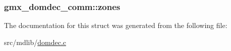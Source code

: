 \hypertarget{structgmx__domdec__comm_a4260bb716c7f7b214dd308f1fb362dce}{
\subsubsection[{zones}]{ {\bf gmx\-\_\-domdec\-\_\-comm\-::zones}}}\label{structgmx__domdec__comm_a4260bb716c7f7b214dd308f1fb362dce}


\-The documentation for this struct was generated from the following file\-:\begin{DoxyCompactItemize}
\item 
src/mdlib/\hyperlink{domdec_8c}{domdec.\-c}\end{DoxyCompactItemize}

